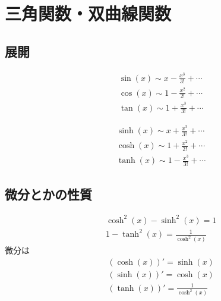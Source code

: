 \documentclass[12pt,dvipdfmx]{jsarticle}
\begin{document}
\section*{\Large{三角関数・双曲線関数}}
\subsection*{展開}
\begin{eqnarray}
  &&\sin(x) \sim x-\frac{x^3}{3!}+\cdots\\
  &&\cos(x) \sim 1-\frac{x^2}{2!}+\cdots\\
  &&\tan(x) \sim 1+\frac{x^3}{3!}+\cdots
\end{eqnarray}

\begin{eqnarray}
  &&\sinh(x) \sim x+\frac{x^3}{3!}+\cdots\\
  &&\cosh(x) \sim 1+\frac{x^2}{2!}+\cdots\\
  &&\tanh(x) \sim 1-\frac{x^3}{3!}+\cdots
\end{eqnarray}
\subsection*{微分とかの性質}
\begin{eqnarray}
  &&\cosh^2(x)-\sinh^2(x)=1\\
  &&1-\tanh^2(x) =\frac{1}{\cosh^2(x)}
\end{eqnarray}
微分は
\begin{eqnarray}
  &&\left(\cosh(x)\right)' = \sinh(x)\\
  &&\left(\sinh(x)\right)' = \cosh(x)\\
  &&\left(\tanh(x)\right)' = \frac{1}{\cosh^2(x)}
\end{eqnarray}
\end{document}

